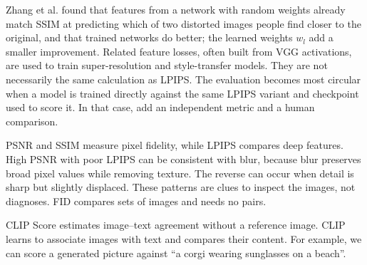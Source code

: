 
{Zhang et al. found that features from a network with random weights already match SSIM at predicting which of two distorted images
people find closer to the original, and that trained networks do better; the learned weights $w_l$ add a smaller improvement. Related
feature losses, often built from VGG activations, are used to train super-resolution and style-transfer models. They are not necessarily
the same calculation as LPIPS. The evaluation becomes most circular when a model is trained directly against the same LPIPS variant and
checkpoint used to score it. In that case, add an independent metric and a human comparison.}

\metricsecondary

PSNR and SSIM measure pixel fidelity, while LPIPS compares deep features. High PSNR with poor LPIPS can be
consistent with blur, because blur preserves broad pixel values while removing texture. The reverse can occur when detail is sharp but
slightly displaced. These patterns are clues to inspect the images, not diagnoses. FID compares sets of images and needs no pairs.

\metricend
\clearpage
\thispagestyle{genaistyle}
\label{sec:clip-score}


CLIP Score estimates image--text agreement without a reference image. CLIP learns to associate images with text and compares their content. For example, we can score a generated picture against ``a corgi wearing sunglasses on a beach''.

\begin{metricformula}
\end{metricformula}

